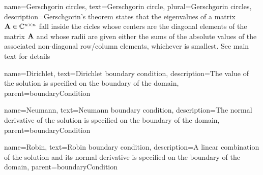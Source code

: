 %
{%
  name={Gerschgorin circles},
  text={Gerschgorin circle},
  plural={Gerschgorin circles},
  description={Gerschgorin's theorem states that the eigenvalues of a matrix $\mathbf{A}\in\mathbb{C}^{n\times n}$ %
		fall inside the cicles whose centers are the diagonal elements of the matrix $\mathbf{A}$ and whose
		radii are given either the sums of the absolute values of the associated non-diagonal row/column elements,
		whichever is smallest. See main text for details}
}

%
{%
	name={Dirichlet},
	text={Dirichlet boundary condition},
	description={The value of the solution is specified on the boundary of the domain},
	parent={boundaryCondition}
}

%
{%
	name={Neumann},
	text={Neumann boundary condition},
	description={The normal derivative of the solution is specified on the boundary of the domain},
	parent={boundaryCondition}
}

%
{%
	name={Robin}, 
	text={Robin boundary condition},
	description={A linear combination of the solution and its normal derivative is specified on the boundary of the domain},
	parent={boundaryCondition}
}

  